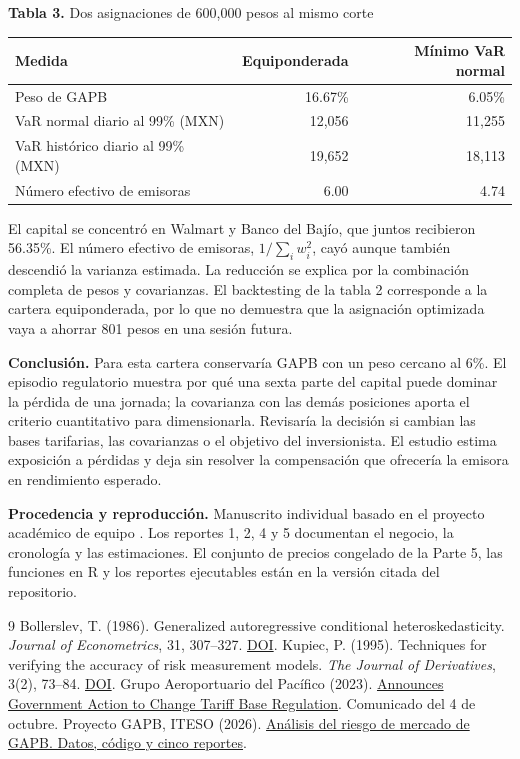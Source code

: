 \documentclass[11pt,letterpaper]{article}
\begin{document}
\begin{center}
\textbf{Tabla 3.} Dos asignaciones de 600,000 pesos al mismo corte\\[5pt]
\begin{tabular}{lrr}\toprule
Medida & Equiponderada & Mínimo VaR normal\\ \midrule
Peso de GAPB & 16.67\% & 6.05\%\\
VaR normal diario al 99\% (MXN) & 12,056 & 11,255\\
VaR histórico diario al 99\% (MXN) & 19,652 & 18,113\\
Número efectivo de emisoras & 6.00 & 4.74\\ \bottomrule
\end{tabular}
\end{center}
El capital se concentró en Walmart y Banco del Bajío, que juntos recibieron 56.35\%. El número efectivo de emisoras, $1/\sum_i w_i^2$, cayó aunque también descendió la varianza estimada. La reducción se explica por la combinación completa de pesos y covarianzas. El backtesting de la tabla 2 corresponde a la cartera equiponderada, por lo que no demuestra que la asignación optimizada vaya a ahorrar 801 pesos en una sesión futura.

\textbf{Conclusión.} Para esta cartera conservaría GAPB con un peso cercano al 6\%. El episodio regulatorio muestra por qué una sexta parte del capital puede dominar la pérdida de una jornada; la covarianza con las demás posiciones aporta el criterio cuantitativo para dimensionarla. Revisaría la decisión si cambian las bases tarifarias, las covarianzas o el objetivo del inversionista. El estudio estima exposición a pérdidas y deja sin resolver la compensación que ofrecería la emisora en rendimiento esperado.

{\small\textbf{Procedencia y reproducción.} Manuscrito individual basado en el proyecto académico de equipo \cite{proyecto}. Los reportes 1, 2, 4 y 5 documentan el negocio, la cronología y las estimaciones. El conjunto de precios congelado de la Parte 5, las funciones en R y los reportes ejecutables están en la versión citada del repositorio.}
{\small
\begin{thebibliography}{9}\setlength{\itemsep}{1pt}
 Bollerslev, T. (1986). Generalized autoregressive conditional heteroskedasticity. \textit{Journal of Econometrics}, 31, 307--327. \href{https://doi.org/10.1016/0304-4076(86)90063-1}{DOI}.
 Kupiec, P. (1995). Techniques for verifying the accuracy of risk measurement models. \textit{The Journal of Derivatives}, 3(2), 73--84. \href{https://doi.org/10.3905/jod.1995.407942}{DOI}.
 Grupo Aeroportuario del Pacífico (2023). \href{https://www.globenewswire.com/news-release/2023/10/05/2755031/0/en/Grupo-Aeroportuario-del-Pacifico-Announces-Government-Action-to-Change-Tariff-Base-Regulation.html}{Announces Government Action to Change Tariff Base Regulation}. Comunicado del 4 de octubre.
 Proyecto GAPB, ITESO (2026). \href{https://github.com/Urielledezma/GAPB-Risk-Analysis/tree/adda9699c88f6b211b9287ee4735621c97d1f1ed}{Análisis del riesgo de mercado de GAPB. Datos, código y cinco reportes}.
\end{thebibliography}}
\end{document}
